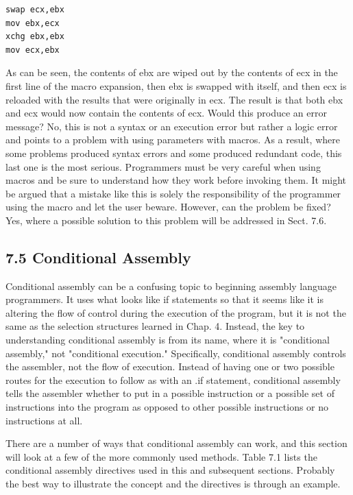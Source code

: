 \documentclass[10pt]{book}
\begin{document}
\begin{center}
\begin{center}
\begin{verbatim}
swap ecx,ebx
mov ebx,ecx
xchg ebx,ebx
mov ecx,ebx
\end{verbatim}

As can be seen, the contents of ebx are wiped out by the contents of ecx in the first line of the macro expansion, then ebx is swapped with itself, and then ecx is reloaded with the results that were originally in ecx. The result is that both ebx and ecx would now contain the contents of ecx. Would this produce an error message? No, this is not a syntax or an execution error but rather a logic error and points to a problem with using parameters with macros. As a result, where some problems produced syntax errors and some produced redundant code, this last one is the most serious. Programmers must be very careful when using macros and be sure to understand how they work before invoking them. It might be argued that a mistake like this is solely the responsibility of the programmer using the macro and let the user beware. However, can the problem be fixed? Yes, where a possible solution to this problem will be addressed in Sect. 7.6.


\subsection*{7.5 Conditional Assembly}
Conditional assembly can be a confusing topic to beginning assembly language programmers. It uses what looks like if statements so that it seems like it is altering the flow of control during the execution of the program, but it is not the same as the selection structures learned in Chap. 4. Instead, the key to understanding conditional assembly is from its name, where it is "conditional assembly," not "conditional execution." Specifically, conditional assembly controls the assembler, not the flow of execution. Instead of having one or two possible routes for the execution to follow as with an .if statement, conditional assembly tells the assembler whether to put in a possible instruction or a possible set of instructions into the program as opposed to other possible instructions or no instructions at all.

There are a number of ways that conditional assembly can work, and this section will look at a few of the more commonly used methods. Table 7.1 lists the conditional assembly directives used in this and subsequent sections. Probably the best way to illustrate the concept and the directives is through an example.


\end{center}
\end{center}
\end{document}
